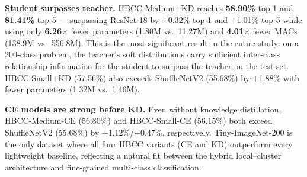 \documentclass[conference]{IEEEtran}
\begin{document}
\begin{table}[ht!]
  \caption{Results on Tiny-ImageNet-200. \textbf{Bold}: best
           \emph{overall} (including ResNet-18). Arrows CE$\to$KD
           indicate same-architecture pairs.}
  \label{tab:tin}
  \centering
  \renewcommand{\arraystretch}{1.15}
\end{table}

\noindent\textbf{Student surpasses teacher.}
HBCC-Medium+KD reaches \textbf{58.90\%} top-1 and \textbf{81.41\%}
top-5 --- surpassing ResNet-18 by $+$0.32\% top-1 and $+$1.01\%
top-5 while using only \textbf{6.26$\times$} fewer parameters (1.80M
vs.\ 11.27M) and \textbf{4.01$\times$} fewer MACs (138.9M vs.\
556.8M). This is the most significant result in the entire study: on
a 200-class problem, the teacher's soft distributions carry sufficient
inter-class relationship information for the student to surpass the
teacher on the test set. HBCC-Small+KD (57.56\%) also exceeds
ShuffleNetV2 (55.68\%) by $+$1.88\% with fewer parameters (1.32M
vs.\ 1.46M).

\noindent\textbf{CE models are strong before KD.}
Even without knowledge distillation, HBCC-Medium-CE (56.80\%) and
HBCC-Small-CE (56.15\%) both exceed ShuffleNetV2 (55.68\%) by
$+$1.12\%/$+$0.47\%, respectively. Tiny-ImageNet-200 is the only
dataset where all four HBCC variants (CE and KD) outperform every
lightweight baseline, reflecting a natural fit between the hybrid
local--cluster architecture and fine-grained multi-class
classification.
\end{document}
